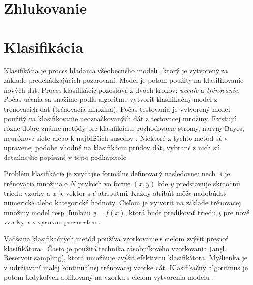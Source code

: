 

\section{Zhlukovanie}





\section{Klasifikácia}
Klasifikácia je proces hľadania všeobecného modelu, ktorý je vytvorený za základe predchádzajúcich pozorovaní. Model je potom použitý na klasifikovanie nových dát. Proces klasifikácie pozostáva z dvoch krokov: \textit{učenie} a \textit{trénovanie}. Počas učenia sa snažíme podľa algoritmu vytvoriť klasifikačný model z trénovacích dát (trénovacia množina). Počas testovania je vytvorený model použitý na klasifikovanie neoznačkovaných dát z testovacej množiny. Existujú rôzne dobre známe metódy pre klasifikáciu: rozhodovacie stromy, naivný Bayes, neurónové siete alebo k-najbližších susedov \citep{nguyen2015survey}. Niektoré z týchto metód sú v upravenej podobe vhodné na klasifikáciu prúdov dát, vybrané z nich sú detailnejšie popísané v tejto podkapitole. 
\par
Problém klasifikácie je zvyčajne formálne definovaný nasledovne: nech $A$ je trénovacia množina o $N$ prvkoch vo forme $(x,y)$ kde $y$ predstavuje skutočnú triedu vzorky a $x$ je vektor s $d$ atribútmi. Každý atribút môže nadobúdať numerické alebo kategorické hodnoty. Cieľom je vytvoriť na základe trénovacej množiny model resp. funkciu $y=f(x)$, ktorá bude predikovať triedu $y$ pre nové vzorky $x$ s vysokou presnosťou \citep{domingos2000mining}. 
\par
Väčšsina klasifikačných metód používa vzorkovanie s cieľom zvýšiť presnoť klasifikátora \citep{aggarwal2014survey, nguyen2015survey}. Často je použitá technika zásobníkového vzorkovania (angl. Reservoir sampling), ktorá umožňuje zvýšiť efektivitu klasifikátora. Myšlienka je v udržiavaní malej kontinuálnej trénovacej vzorke dát. Klasifikačný algoritmus je potom kedykoľvek aplikovaný na vzorku s cieľom vytvorenia modelu \citep{aggarwal2014survey}.

